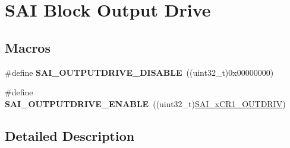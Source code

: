 \hypertarget{group___s_a_i___block___output___drive}{}\section{S\+AI Block Output Drive}
\label{group___s_a_i___block___output___drive}
\subsection*{Macros}
\begin{DoxyCompactItemize}
\item 
\#define {\bfseries S\+A\+I\+\_\+\+O\+U\+T\+P\+U\+T\+D\+R\+I\+V\+E\+\_\+\+D\+I\+S\+A\+B\+LE}~((uint32\+\_\+t)0x00000000)\hypertarget{group___s_a_i___block___output___drive_ga9cbab08449710c0a8560afb0c43c504f}{}\label{group___s_a_i___block___output___drive_ga9cbab08449710c0a8560afb0c43c504f}

\item 
\#define {\bfseries S\+A\+I\+\_\+\+O\+U\+T\+P\+U\+T\+D\+R\+I\+V\+E\+\_\+\+E\+N\+A\+B\+LE}~((uint32\+\_\+t)\hyperlink{group___peripheral___registers___bits___definition_ga3c79a642d52f20f97ab575f655b1ddea}{S\+A\+I\+\_\+x\+C\+R1\+\_\+\+O\+U\+T\+D\+R\+IV})\hypertarget{group___s_a_i___block___output___drive_ga493ab9677b3aa03987e1a82f9af40542}{}\label{group___s_a_i___block___output___drive_ga493ab9677b3aa03987e1a82f9af40542}

\end{DoxyCompactItemize}


\subsection{Detailed Description}
